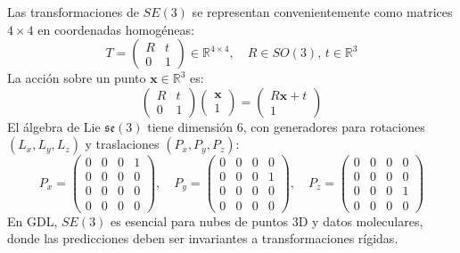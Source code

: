 \begin{example}\label{ex:se3_homogeneas}
Las transformaciones de $SE(3)$ se representan convenientemente como matrices $4 \times 4$ en coordenadas homogéneas:
\begin{equation}
T = \begin{pmatrix}
R & t \\
0 & 1
\end{pmatrix} \in \mathbb{R}^{4 \times 4}, \quad R \in SO(3), \, t \in \mathbb{R}^3
\end{equation}
La acción sobre un punto $\mathbf{x} \in \mathbb{R}^3$ es:
\begin{equation}
\begin{pmatrix}
R & t \\
0 & 1
\end{pmatrix}
\begin{pmatrix}
\mathbf{x} \\
1
\end{pmatrix}
= \begin{pmatrix}
R\mathbf{x} + t \\
1
\end{pmatrix}
\end{equation}
El álgebra de Lie $\mathfrak{se}(3)$ tiene dimensión 6, con generadores para rotaciones $(L_x, L_y, L_z)$ y traslaciones $(P_x, P_y, P_z)$:
\begin{equation}
P_x = \begin{pmatrix}
0 & 0 & 0 & 1 \\
0 & 0 & 0 & 0 \\
0 & 0 & 0 & 0 \\
0 & 0 & 0 & 0
\end{pmatrix}, \quad
P_y = \begin{pmatrix}
0 & 0 & 0 & 0 \\
0 & 0 & 0 & 1 \\
0 & 0 & 0 & 0 \\
0 & 0 & 0 & 0
\end{pmatrix}, \quad
P_z = \begin{pmatrix}
0 & 0 & 0 & 0 \\
0 & 0 & 0 & 0 \\
0 & 0 & 0 & 1 \\
0 & 0 & 0 & 0
\end{pmatrix}
\end{equation}
En \gls{GDL}, $SE(3)$ es esencial para nubes de puntos 3D y datos moleculares, donde las predicciones deben ser invariantes a transformaciones rígidas.
\end{example}

